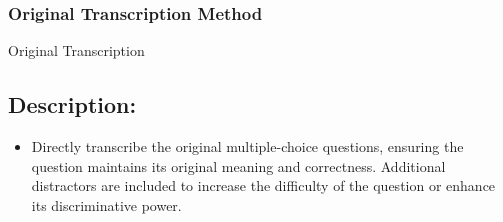\subsubsection{Original Transcription Method}
\begin{methodbox}{Original Transcription}
\subsection*{Description:}
\begin{itemize}
    \item Directly transcribe the original multiple-choice questions, ensuring the question maintains its original meaning and correctness. Additional distractors are included to increase the difficulty of the question or enhance its discriminative power.
\end{itemize}

\end{methodbox}
